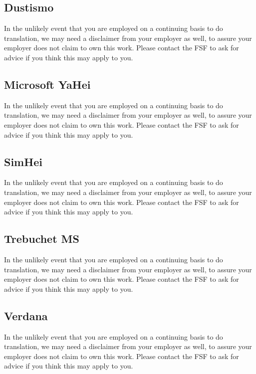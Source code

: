 \documentclass[a4paper,12pt,openany]{book}
\begin{document}
  \subsection{Dustismo}
    In the unlikely event that you are employed on a continuing basis to do
    translation, we may need a disclaimer from your employer as well, to assure
    your employer does not claim to own this work.  Please contact the FSF to
    ask for advice if you think this may apply to you.

  \subsection{Microsoft YaHei}
    In the unlikely event that you are employed on a continuing basis to do
    translation, we may need a disclaimer from your employer as well, to assure
    your employer does not claim to own this work.  Please contact the FSF to
    ask for advice if you think this may apply to you.

  \subsection{SimHei}
    In the unlikely event that you are employed on a continuing basis to do
    translation, we may need a disclaimer from your employer as well, to assure
    your employer does not claim to own this work.  Please contact the FSF to
    ask for advice if you think this may apply to you.

  \subsection{Trebuchet MS}
    In the unlikely event that you are employed on a continuing basis to do
    translation, we may need a disclaimer from your employer as well, to assure
    your employer does not claim to own this work.  Please contact the FSF to
    ask for advice if you think this may apply to you.


  \subsection{Verdana}
    In the unlikely event that you are employed on a continuing basis to do
    translation, we may need a disclaimer from your employer as well, to assure
    your employer does not claim to own this work.  Please contact the FSF to
    ask for advice if you think this may apply to you.
\end{document}
